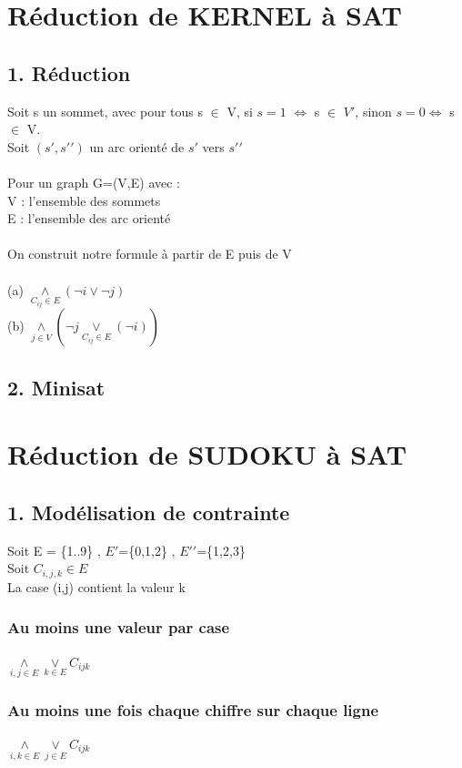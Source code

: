 \documentclass[12pt]{report}
\begin{document}
\section*{Réduction de KERNEL à SAT}
\subsection*{1. Réduction}

Soit s un sommet, avec pour tous s $\in$ V, si $s=1$ $\Leftrightarrow$ s $\in$ $V\prime$, sinon $ s=0 \Leftrightarrow$ s $\in$ V. \\
Soit $(s\prime, s\prime\prime)$ un arc orienté de $s\prime$ vers $s\prime\prime$\\
\\
Pour un graph G=(V,E) avec : \\
V : l'ensemble des sommets\\
E : l'ensemble des arc orienté\\
\\
On construit notre formule à partir de E puis de V\\
\\
(a) $\underset{C_{ij} \in E}{\land} (\lnot i \lor \lnot j)$ \\
(b) $\underset{j \in V}{\land} (\lnot j \underset{C_{ij} \in E}{\lor} (\lnot i))$

\subsection*{2. Minisat}
\section*{Réduction de SUDOKU à SAT}
\subsection*{1. Modélisation de contrainte}
Soit E = \{1..9\} , $E\prime$=\{0,1,2\} , $E\prime\prime$=\{1,2,3\}\\
Soit $C_{i,j,k} \in E$\\
La case (i,j) contient la valeur k
\subsubsection*{Au moins une valeur par case}
$\underset{i,j \in E}{\land} \underset{k \in E}{\lor} C_{ijk}$
\subsubsection*{Au moins une fois chaque chiffre sur chaque ligne}
$\underset{i,k \in E}{\land} \underset{j \in E}{\lor} C_{ijk}$
\end{document}
